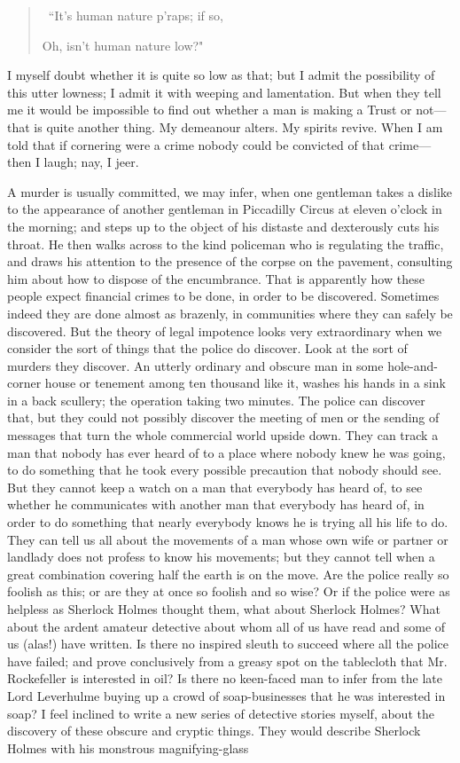 \documentclass{book}
\begin{document}
\begin{quotation}\
	“It’s human nature p’raps; if so,

	Oh, isn’t human nature low?"
\end{quotation}

I myself doubt whether it is quite so low as that; but I admit the possibility of this utter lowness; I admit it with weeping and lamentation. But when they tell me it would be impossible to find out whether a man is making a Trust or not—that is quite another thing. My demeanour alters. My spirits revive. When I am told that if cornering were a crime nobody could be convicted of that crime—then I laugh; nay, I jeer.

A murder is usually committed, we may infer, when one gentleman takes a dislike to the appearance of another gentleman in Piccadilly Circus at eleven o’clock in the morning; and steps up to the object of his distaste and dexterously cuts his throat. He then walks across to the kind policeman who is regulating the traffic, and draws his attention to the presence of the corpse on the pavement, consulting him about how to dispose of the encumbrance. That is apparently how these people expect financial crimes to be done, in order to be discovered. Sometimes indeed they are done almost as brazenly, in communities where they can safely be discovered. But the theory of legal impotence looks very extraordinary when we consider the sort of things that the police do discover. Look at the sort of murders they discover. An utterly ordinary and obscure man in some hole-and-corner house or tenement among ten thousand like it, washes his hands in a sink in a back scullery; the operation taking two minutes. The police can discover that, but they could not possibly discover the meeting of men or the sending of messages that turn the whole commercial world upside down. They can track a man that nobody has ever heard of to a place where nobody knew he was going, to do something that he took every possible precaution that nobody should see. But they cannot keep a watch on a man that everybody has heard of, to see whether he communicates with another man that everybody has heard of, in order to do something that nearly everybody knows he is trying all his life to do. They can tell us all about the movements of a man whose own wife or partner or landlady does not profess to know his movements; but they cannot tell when a great combination covering half the earth is on the move. Are the police really so foolish as this; or are they at once so foolish and so wise? Or if the police were as helpless as Sherlock Holmes thought them, what about Sherlock Holmes? What about the ardent amateur detective about whom all of us have read and some of us (alas!) have written. Is there no inspired sleuth to succeed where all the police have failed; and prove conclusively from a greasy spot on the tablecloth that Mr. Rockefeller is interested in oil? Is there no keen-faced man to infer from the late Lord Leverhulme buying up a crowd of soap-businesses that he was interested in soap? I feel inclined to write a new series of detective stories myself, about the discovery of these obscure and cryptic things. They would describe Sherlock Holmes with his monstrous magnifying-glass 
\end{document}
